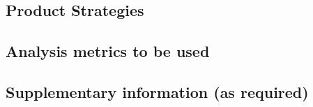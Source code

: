 \documentclass{article}
\begin{document}
\subsection{Product Strategies}

\subsection{Analysis metrics to be used}

\subsection{Supplementary information (as required)}
\end{document}
